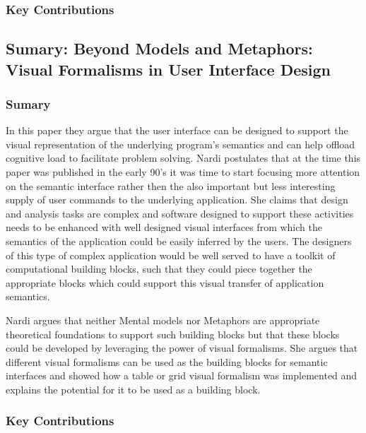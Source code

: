 \documentclass{sig-alternate}
\begin{document}
\subsubsection{Key Contributions}
\subsection{Sumary: Beyond Models and Metaphors: Visual Formalisms in User
Interface Design\cite{Nardi:BeyondModels}}
\subsubsection{Sumary}
In this paper they argue that the user interface can be designed to support
the visual representation of the underlying program's semantics and can help
offload cognitive load to facilitate problem solving. Nardi postulates that at
the time this paper was published in the early 90's it was time to start
focusing more attention on the semantic interface rather then the also
important but less interesting supply of user commands to the underlying
application. She claims that design and analysis tasks are complex and software
designed to support these activities needs to be enhanced with well designed
visual interfaces from which the semantics of the application could be easily
inferred by the users. The designers of this type of complex application would
be well served to have a toolkit of computational building blocks, such that
they could piece together the appropriate blocks which could support this
visual transfer of application semantics.

Nardi argues that neither Mental models nor Metaphors are appropriate
theoretical foundations to support such  building blocks but that these blocks
could be developed by leveraging the power of visual formalisms. She argues that
different visual formalisms can be used as the building blocks for semantic
interfaces and showed how a table or grid visual formalism was implemented and
explains the potential for it to be used as a building block.
\subsubsection{Key Contributions}
\end{document}
